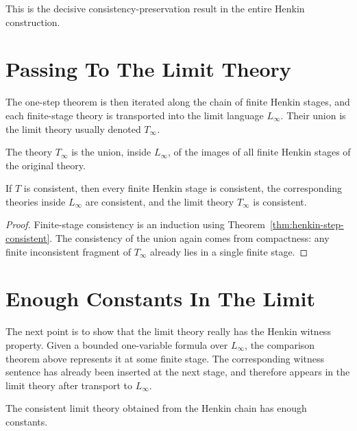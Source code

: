 This is the decisive consistency-preservation result in the entire Henkin
construction.

\section{Passing To The Limit Theory}

The one-step theorem is then iterated along the chain of finite Henkin stages,
and each finite-stage theory is transported into the limit language $L_\infty$.
Their union is the limit theory usually denoted $T_\infty$.

\begin{definition}
\label{def:tinfty-theories}
The theory $T_\infty$ is the union, inside $L_\infty$, of the images of all
finite Henkin stages of the original theory.
\end{definition}

\begin{theorem}
\label{thm:henkin-tinfty-consistent}
If $T$ is consistent, then every finite Henkin stage is consistent, the
corresponding theories inside $L_\infty$ are consistent, and the limit theory
$T_\infty$ is consistent.
\end{theorem}

\begin{proof}
Finite-stage consistency is an induction using
Theorem~\ref{thm:henkin-step-consistent}. The consistency of the union again
comes from compactness: any finite inconsistent fragment of $T_\infty$ already
lies in a single finite stage.
\end{proof}

\section{Enough Constants In The Limit}

The next point is to show that the limit theory really has the Henkin witness
property. Given a bounded one-variable formula over $L_\infty$, the comparison
theorem above represents it at some finite stage. The corresponding witness
sentence has already been inserted at the next stage, and therefore appears in
the limit theory after transport to $L_\infty$.

\begin{proposition}
\label{prop:henkinization-has-enough-constants}
The consistent limit theory obtained from the Henkin chain has enough
constants.
\end{proposition}

